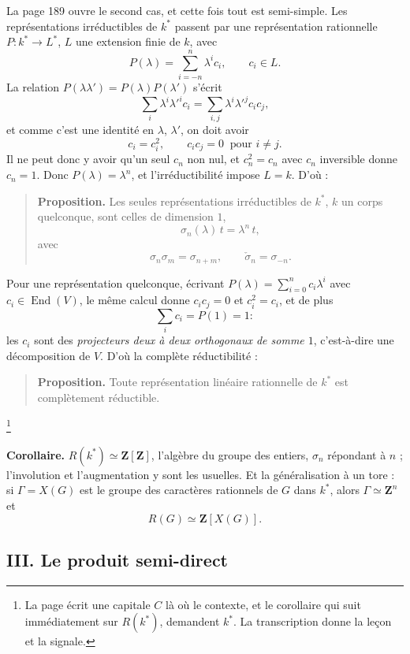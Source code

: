 \documentclass[11pt,a4paper]{article}
\begin{document}
La page 189 ouvre le second cas, et cette fois tout est semi-simple. Les
représentations irréductibles de $k^{*}$ passent par une représentation
rationnelle $P \colon k^{*} \to L^{*}$, $L$ une extension finie de $k$, avec
\[
P(\lambda) = \sum_{i=-n}^{n} \lambda^{i} c_{i} , \qquad c_{i} \in L .
\]
La relation $P(\lambda\lambda') = P(\lambda)P(\lambda')$ s'écrit
\[
\sum_{i} \lambda^{i}\lambda'^{i}c_{i}
= \sum_{i,j} \lambda^{i}\lambda'^{j}c_{i}c_{j} ,
\]
et comme c'est une identité en $\lambda$, $\lambda'$, on doit avoir
\[
c_{i} = c_{i}^{2} ,
\qquad c_{i}c_{j} = 0 \ \text{ pour } i \neq j .
\]
Il ne peut donc y avoir qu'un seul $c_{n}$ non nul, et $c_{n}^{2} = c_{n}$ avec
$c_{n}$ inversible donne $c_{n} = 1$. Donc $P(\lambda) = \lambda^{n}$, et
l'irréductibilité impose $L = k$. D'où :
\begin{quote}
\textbf{Proposition.} Les seules représentations irréductibles de $k^{*}$, $k$
un corps quelconque, sont celles de dimension $1$,
\[
\sigma_{n}(\lambda)\,t = \lambda^{n}\,t ,
\]
avec
\[
\sigma_{n}\sigma_{m} = \sigma_{n+m} ,
\qquad \check{\sigma}_{n} = \sigma_{-n} .
\]
\end{quote}
Pour une représentation quelconque, écrivant $P(\lambda) = \sum_{i=0}^{n}
c_{i}\lambda^{i}$ avec $c_{i} \in \operatorname{End}(V)$, le même calcul donne
$c_{i}c_{j} = 0$ et $c_{i}^{2} = c_{i}$, et de plus
\[
\sum_{i} c_{i} = P(1) = 1 :
\]
les $c_{i}$ sont des \emph{projecteurs deux à deux orthogonaux de somme $1$},
c'est-à-dire une décomposition de $V$. D'où la complète réductibilité :
\begin{quote}
\textbf{Proposition.} Toute représentation linéaire rationnelle de $k^{*}$ est
complètement réductible.
\end{quote}
\footnote{La page écrit une capitale $C$ là où le contexte, et le corollaire
qui suit immédiatement sur $R(k^{*})$, demandent $k^{*}$. La transcription
donne la leçon et la signale.}

\textbf{Corollaire.} $R(k^{*}) \simeq \mathbf{Z}[\mathbf{Z}]$, l'algèbre du
groupe des entiers, $\sigma_{n}$ répondant à $n$ ; l'involution et
l'augmentation y sont les usuelles. Et la généralisation à un tore : si
$\Gamma = X(G)$ est le groupe des caractères rationnels de $G$ dans $k^{*}$,
alors $\Gamma \simeq \mathbf{Z}^{n}$ et
\[
R(G) \simeq \mathbf{Z}[X(G)] .
\]

\subsection*{III. Le produit semi-direct}
\end{document}
